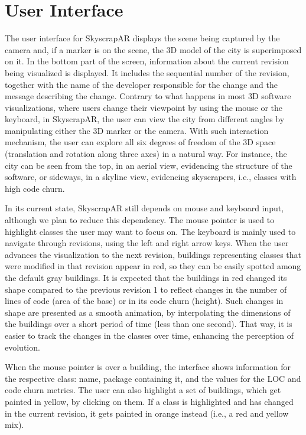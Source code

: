 \section{User Interface} \label{sec:user_interface}
The user interface for SkyscrapAR displays the scene being captured by the camera and, if a marker is on the scene, the 3D model of the city is superimposed on it. In the bottom part of the screen, information about the current revision being visualized is displayed. It includes the sequential number of the revision, together with the name of the developer responsible for the change and the message describing the change.
Contrary to what happens in most 3D software visualizations, where users change their viewpoint by using the mouse or the keyboard, in SkyscrapAR, the user can view the city from different angles by manipulating either the 3D marker or the camera. With such interaction mechanism, the user can explore all six degrees of freedom of the 3D space (translation and rotation along three axes) in a natural way. For instance, the city can be seen from the top, in an aerial view, evidencing the structure of the software, or sideways, in a skyline view, evidencing skyscrapers, i.e., classes with high code churn.

In its current state, SkyscrapAR still depends on mouse and keyboard input, although we plan to reduce this dependency. The mouse pointer is used to highlight classes the user may want to focus on. The keyboard is mainly used to navigate through revisions, using the left and right arrow keys.
When the user advances the visualization to the next revision, buildings representing classes that were modified in that revision appear in red, so they can be easily spotted among the default gray buildings. It is expected that the buildings in red changed its shape compared to the previous revision 1 to reflect changes in the number of lines of code (area of the base) or in its code churn (height). Such changes in shape are presented as a smooth animation, by interpolating the dimensions of the buildings over a short period of time (less than one second). That way, it is easier to track the changes in the classes over time, enhancing the perception of evolution.

When the mouse pointer is over a building, the interface shows information for the respective class: name, package containing it, and the values for the LOC and code churn metrics. The user can also highlight a set of buildings, which get painted in yellow, by clicking on them. If a class is highlighted and has changed in the current revision, it gets painted in orange instead (i.e., a red and yellow mix). 

